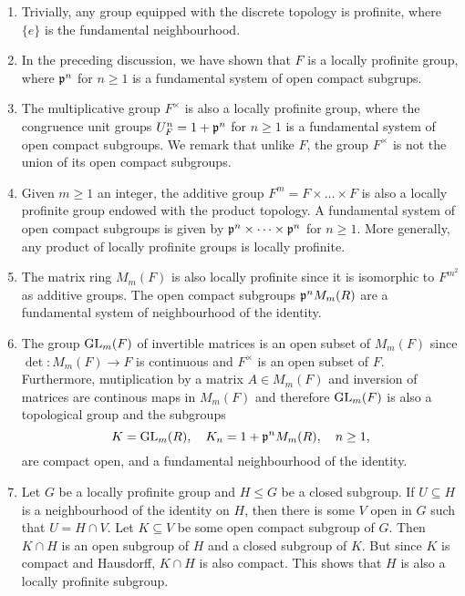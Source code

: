 \begin{examples}
    \begin{enumerate}
        \item Trivially, any group equipped with the discrete topology is profinite, where $\{e\}$ is the fundamental neighbourhood.
        \item In the preceding discussion, we have shown that $F$ is a locally profinite group, where $\mathfrak{p}^n$ for $n\geq1$ is a fundamental system of open compact subgrups.
        \item The multiplicative group $F^{\times}$ is also a locally profinite group, where the congruence unit groups $U_F^n=1+\mathfrak{p}^n$ for $n\geq1$ is a fundamental system of open compact subgroups. We remark that unlike $F$, the group $F^{\times}$ is not the union of its open compact subgroups.
        \item Given $m\geq1$ an integer, the additive group $F^m=F\times\dots\times F$ is also a locally profinite group endowed with the product topology. A fundamental system of open compact subgroups is given by $\mathfrak{p}^{n}\times\dots\times\mathfrak{p}^{n}$ for $n\geq1$. More generally, any product of locally profinite groups is locally profinite.
        \item The matrix ring $M_m(F)$ is also locally profinite since it is isomorphic to $F^{m^2}$ as additive groups. The open compact subgroups $\mathfrak{p}^n M_m(R)$ are a fundamental system of neighbourhood of the identity.
        \item The group $\mathrm{GL}_m(F)$ of invertible matrices is an open subset of $M_m(F)$ since $\det:M_m(F)\rightarrow F$ is continuous and $F^{\times}$ is an open subset of $F$. Furthermore, mutiplication by a matrix $A\in M_m(F)$ and inversion of matrices are continous maps in $M_m(F)$ and therefore $\mathrm{GL}_m(F)$ is also a topological group and the subgroups
        $$K=\mathrm{GL}_m(R),\quad K_n=1+\mathfrak{p}^nM_m(R),\quad n\geq 1,$$
        are compact open, and a fundamental neighbourhood of the identity.
        \item Let $G$ be a locally profinite group and $H\leq G$ be a closed subgroup. If $U\subseteq H$ is a neighbourhood of the identity on $H$, then there is some $V$ open in $G$ such that $U=H\cap V$. Let $K\subseteq V$ be some open compact subgroup of $G$. Then $K\cap H$ is an open subgroup of $H$ and a closed subgroup of $K$. But since $K$ is compact and Hausdorff, $K\cap H$ is also compact. This shows that $H$ is also a locally profinite subgroup.
    \end{enumerate}
\end{examples}

